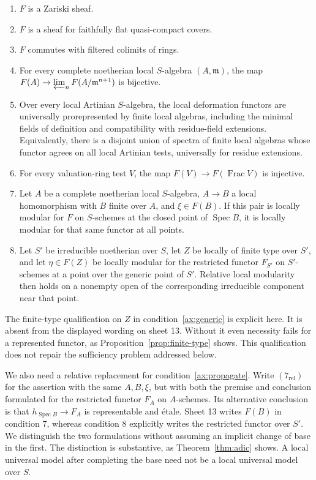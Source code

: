 \documentclass[11pt]{article}
\theoremstyle{definition}\newtheorem{definition}[theorem]{Definition}
\theoremstyle{remark}\newtheorem{remark}[theorem]{Remark}
\newcommand{\Spec}{\operatorname{Spec}}
\begin{document}
\begin{enumerate}[label=(\arabic*),ref=\arabic*,leftmargin=*]
\item\label{ax:zariski} $F$ is a Zariski sheaf.
\item\label{ax:fpqc} $F$ is a sheaf for faithfully flat quasi-compact covers.
\item\label{ax:limits} $F$ commutes with filtered colimits of rings.
\item\label{ax:complete} For every complete noetherian local $S$-algebra $(A,\mathfrak m)$, the map $F(A)\to\varprojlim_n F(A/\mathfrak m^{n+1})$ is bijective.
\item\label{ax:artin} Over every local Artinian $S$-algebra, the local deformation functors are universally prorepresented by finite local algebras, including the minimal fields of definition and compatibility with residue-field extensions. Equivalently, there is a disjoint union of spectra of finite local algebras whose functor agrees on all local Artinian tests, universally for residue extensions.
\item\label{ax:valuation} For every valuation-ring test $V$, the map $F(V)\to F(\operatorname{Frac}V)$ is injective.
\item\label{ax:propagate} Let $A$ be a complete noetherian local $S$-algebra, $A\to B$ a local homomorphism with $B$ finite over $A$, and $\xi\in F(B)$. If this pair is locally modular for $F$ on $S$-schemes at the closed point of $\Spec B$, it is locally modular for that same functor at all points.
\item\label{ax:generic} Let $S'$ be irreducible noetherian over $S$, let $Z$ be locally of finite type over $S'$, and let $\eta\in F(Z)$ be locally modular for the restricted functor $F_{S'}$ on $S'$-schemes at a point over the generic point of $S'$. Relative local modularity then holds on a nonempty open of the corresponding irreducible component near that point.
\end{enumerate}

The finite-type qualification on $Z$ in condition~\ref{ax:generic} is explicit here. It is absent from the displayed wording on sheet 13. Without it even necessity fails for a represented functor, as Proposition~\ref{prop:finite-type} shows. This qualification does not repair the sufficiency problem addressed below.

We also need a relative replacement for condition~\ref{ax:propagate}. Write $(7_{\mathrm{rel}})$ for the assertion with the same $A,B,\xi$, but with both the premise and conclusion formulated for the restricted functor $F_A$ on $A$-schemes. Its alternative conclusion is that $h_{\Spec B}\to F_A$ is representable and \'etale. Sheet 13 writes $F(B)$ in condition 7, whereas condition 8 explicitly writes the restricted functor over $S'$. We distinguish the two formulations without assuming an implicit change of base in the first. The distinction is substantive, as Theorem~\ref{thm:adic} shows. A local universal model after completing the base need not be a local universal model over $S$.
\end{document}
